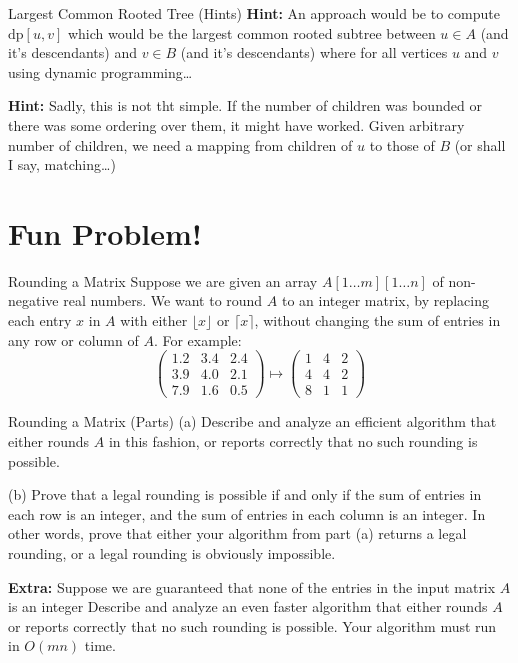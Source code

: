 \documentclass[aspectratio=169,11pt]{beamer}
\newcommand{\blankslides}{%
  \begin{frame}[plain]\end{frame}%
  \begin{frame}[plain]\end{frame}%
}
\begin{document}
\begin{frame}{Largest Common Rooted Tree (Hints)}
\textbf{Hint:} An approach would be to compute $\mathrm{dp}[u,v]$ which would be the largest common rooted
subtree between $u\in A$ (and it's descendants) and $v\in B$ (and it's descendants) where for all vertices
$u$ and $v$ using dynamic programming\ldots

\medskip
\textbf{Hint:} Sadly, this is not tht simple. If the number of children was bounded or there was some
ordering over them, it might have worked. Given arbitrary number of children, we need a mapping from
children of $u$ to those of $B$ (or shall I say, matching\ldots)
\end{frame}
\blankslides

\section{Fun Problem!}

\begin{frame}{Rounding a Matrix}
Suppose we are given an array $A[1\ldots m][1\ldots n]$ of non-negative real numbers. We want to round $A$
to an integer matrix, by replacing each entry $x$ in $A$ with either $\lfloor x\rfloor$ or $\lceil x\rceil$,
without changing the sum of entries in any row or column of $A$. For example:
\[
\begin{pmatrix}
1.2 & 3.4 & 2.4\\
3.9 & 4.0 & 2.1\\
7.9 & 1.6 & 0.5
\end{pmatrix}
\mapsto
\begin{pmatrix}
1 & 4 & 2\\
4 & 4 & 2\\
8 & 1 & 1
\end{pmatrix}
\]
\end{frame}

\begin{frame}{Rounding a Matrix (Parts)}
(a) Describe and analyze an efficient algorithm that either rounds $A$ in this fashion, or reports
correctly that no such rounding is possible.

\medskip
(b) Prove that a legal rounding is possible if and only if the sum of entries in each row is an integer,
and the sum of entries in each column is an integer. In other words, prove that either your algorithm from
part (a) returns a legal rounding, or a legal rounding is obviously impossible.

\medskip
\textbf{Extra:} Suppose we are guaranteed that none of the entries in the input matrix $A$ is an integer
Describe and analyze an even faster algorithm that either rounds $A$ or reports correctly that no such
rounding is possible. Your algorithm must run in $O(mn)$ time.
\end{frame}
\blankslides
\end{document}
